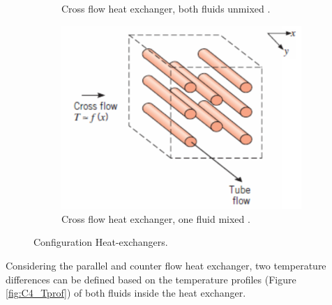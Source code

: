 \begin{figure}[h]
\begin{subfigure}[b]{0.4\textwidth}
        \caption{Cross flow heat exchanger, both fluids unmixed \cite{Ngendakumana2018}.}
        \label{fig:C4_cross_flow_unmixed}
    \end{subfigure}
    \begin{subfigure}[b]{0.4\textwidth}
        \centering
        \includegraphics[width=\textwidth]{crossed_flow_one_mixed}
        \caption{Cross flow heat exchanger, one fluid mixed \cite{Ngendakumana2018}.}
        \label{fig:C4_cross_flow_1mixed}
    \end{subfigure}
    \caption{Configuration Heat-exchangers.} \label{fig:C4_config}
\end{figure}
Considering the parallel and counter flow heat exchanger, two temperature differences can be defined based on the temperature profiles (Figure \ref{fig:C4_Tprof}) of both fluids inside the heat exchanger.


